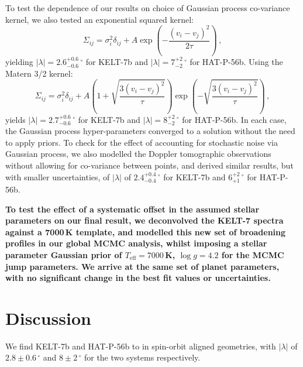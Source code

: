 \documentclass[useAMS,usenatbib]{mn2e}
\begin{document}
To test the dependence of our results on choice of Gaussian process co-variance kernel, we also tested an exponential squared kernel:
\begin{equation}
  \Sigma_{ij} = \sigma_{i}^2 \delta_{ij} + A \exp \left(- \frac{(v_{i}-v_{j})^2}{2\tau} \right)\,,
\end{equation}
yielding $|\lambda| = 2.6_{-0.6}^{+0.6}\,^\circ$ for KELT-7b and $|\lambda| = 7_{-2}^{+2}\,^\circ$ for HAT-P-56b.
Using the Matern 3/2 kernel:
\begin{equation}
  \Sigma_{ij} = \sigma_{i}^2 \delta_{ij} + A \left( 1+\sqrt{\frac{3(v_{i}-v_{j})^2}{\tau}} \right) \exp \left(-\sqrt{\frac{3 (v_{i}-v_{j})^2}{\tau}}\right)\,,
\end{equation}
yields $|\lambda| = 2.7_{-0.6}^{+0.6}\,^\circ$ for KELT-7b and $|\lambda| = 8_{-2}^{+2}\,^\circ$ for HAT-P-56b. In each case, the Gaussian process hyper-parameters converged to a solution without the need to apply priors.  To check for the effect of accounting for stochastic noise via Gaussian process, we also modelled the Doppler tomographic observations without allowing for co-variance between points, and derived similar results, but with smaller uncertainties, of $|\lambda|$ of $2.4_{-0.4}^{+0.4}\,^\circ$ for KELT-7b and $6_{+1}^{+2}\,^\circ$ for HAT-P-56b. 

\textbf{To test the effect of a systematic offset in the assumed stellar parameters on our final result, we deconvolved the KELT-7 spectra against a 7000\,K template,  and modelled this new set of broadening profiles in our global MCMC analysis, whilst imposing a stellar parameter Gaussian prior of $T_\mathrm{eff}=7000$\,K, $\log g=4.2$ for the MCMC jump parameters. We arrive at the same set of planet parameters, with no significant change in the best fit values or uncertainties.}

\section{Discussion}
\label{sec:discussion}

We find KELT-7b and HAT-P-56b to in spin-orbit aligned geometries, with $|\lambda|$ of $2.8 \pm 0.6\,^\circ$ and $8 \pm 2\,^\circ$ for the two systems respectively.
\end{document}
